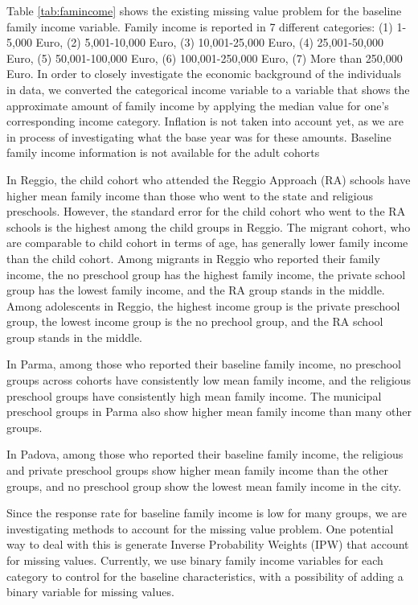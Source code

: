 \documentclass[12pt]{article}
\begin{document}
Table \ref{tab:famincome} shows the existing missing value problem for the baseline family income variable. Family income is reported in 7 different categories: (1) 1-5,000 Euro, (2) 5,001-10,000 Euro, (3) 10,001-25,000 Euro, (4) 25,001-50,000 Euro, (5) 50,001-100,000 Euro, (6) 100,001-250,000 Euro, (7) More than 250,000 Euro. In order to closely investigate the economic background of the individuals in data, we converted the categorical income variable to a variable that shows the approximate amount of family income by applying the median value for one's corresponding income category. Inflation is not taken into account yet, as we are in process of investigating what the base year was for these amounts. Baseline family income information is not available for the adult cohorts

In Reggio, the child cohort who attended the Reggio Approach (RA) schools have higher mean family income than those who went to the state and religious preschools. However, the standard error for the child cohort who went to the RA schools is the highest among the child groups in Reggio. The migrant cohort, who are comparable to child cohort in terms of age, has generally lower family income than the child cohort. Among migrants in Reggio who reported their family income, the no preschool group has the highest family income, the private school group has the lowest family income, and the RA group stands in the middle. Among adolescents in Reggio, the highest income group is the private preschool group, the lowest income group is the no prechool group, and the RA school group stands in the middle. 

In Parma, among those who reported their baseline family income, no preschool groups across cohorts have consistently low mean family income, and the religious preschool groups have consistently high mean family income. The municipal preschool groups in Parma also show higher mean family income than many other groups. 

In Padova, among those who reported their baseline family income, the religious and private preschool groups show higher mean family income than the other groups, and no preschool group show the lowest mean family income in the city. 

Since the response rate for baseline family income is low for many groups, we are investigating methods to account for the missing value problem. One potential way to deal with this is generate Inverse Probability Weights (IPW) that account for missing values. Currently, we use binary family income variables for each category to control for the baseline characteristics, with a possibility of adding a binary variable for missing values. 
\end{document}
